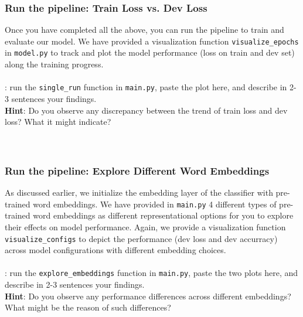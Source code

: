 \subsubsection{Run the pipeline: Train Loss vs. Dev Loss}
Once you have completed all the \todo{} above, you can run the pipeline to train and evaluate our model. We have provided a visualization function \texttt{visualize\_epochs} in \texttt{model.py} to track and plot the model performance (loss on train and dev set) along the training progress.\\\\
\noindent \todo{}: run the \texttt{single\_run} function in \texttt{main.py}, paste the plot here, and describe in 2-3 sentences your findings.\\
\noindent \textbf{Hint}: Do you observe any discrepancy between the trend of train loss and dev loss? What it might indicate?
\\\\
\noindent {\color{red}{your plots and answer:}}\\

\noindent\solution{}

\subsubsection{Run the pipeline: Explore Different Word Embeddings}
As discussed earlier, we initialize the embedding layer of the classifier with pre-trained word embeddings. We have provided in \texttt{main.py} 4 different types of pre-trained word embeddings as different representational options for you to explore their effects on model performance. Again, we provide a visualization function \texttt{visualize\_configs} to depict the performance (dev loss and dev accurracy) across model configurations with different embedding choices. \\\\

\noindent \todo{}: run the \texttt{explore\_embeddings} function in \texttt{main.py}, paste the two plots here, and describe in 2-3 sentences your findings.\\
\noindent \textbf{Hint}: Do you observe any performance differences across different embeddings? What might be the reason of such differences? 
\\\\
\noindent {\color{red}{your plot and answer:}}\\

\noindent\solution{}

\newpage




